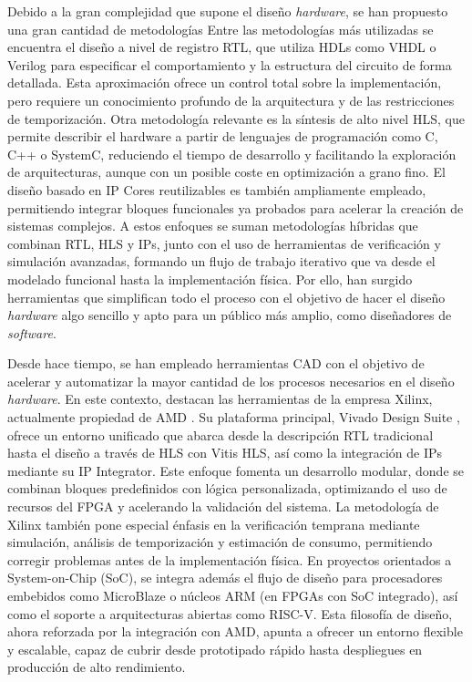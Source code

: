 Debido a la gran complejidad que supone el diseño \textit{hardware}, se han propuesto una gran cantidad de metodologías \cite{metodologiasHW} Entre las metodologías más utilizadas se encuentra el diseño a nivel de registro \ac{RTL}, que utiliza \ac{HDL}s como \ac{VHDL} o Verilog para especificar el comportamiento y la estructura del circuito de forma detallada. Esta aproximación ofrece un control total sobre la implementación, pero requiere un conocimiento profundo de la arquitectura y de las restricciones de temporización. Otra metodología relevante es la síntesis de alto nivel \ac{HLS}, que permite describir el hardware a partir de lenguajes de programación como C, C++ o SystemC, reduciendo el tiempo de desarrollo y facilitando la exploración de arquitecturas, aunque con un posible coste en optimización a grano fino. El diseño basado en \ac{IP} Cores reutilizables es también ampliamente empleado, permitiendo integrar bloques funcionales ya probados para acelerar la creación de sistemas complejos. A estos enfoques se suman metodologías híbridas que combinan RTL, HLS y IPs, junto con el uso de herramientas de verificación y simulación avanzadas, formando un flujo de trabajo iterativo que va desde el modelado funcional hasta la implementación física. Por ello, han surgido herramientas que simplifican todo el proceso con el objetivo de hacer el diseño \textit{hardware} algo sencillo y apto para un público más amplio, como diseñadores de \textit{software}. 

Desde hace tiempo, se han empleado herramientas \ac{CAD} con el objetivo de acelerar y automatizar la mayor cantidad de los procesos necesarios en el diseño \textit{hardware}. En este contexto, destacan las herramientas de la empresa Xilinx, actualmente propiedad de AMD \cite{compraXilinx}. Su plataforma principal, Vivado Design Suite \cite{vivadoInfo}, ofrece un entorno unificado que abarca desde la descripción RTL tradicional hasta el diseño a través de HLS con Vitis HLS, así como la integración de IPs mediante su IP Integrator. Este enfoque fomenta un desarrollo modular, donde se combinan bloques predefinidos con lógica personalizada, optimizando el uso de recursos del FPGA y acelerando la validación del sistema. La metodología de Xilinx también pone especial énfasis en la verificación temprana mediante simulación, análisis de temporización y estimación de consumo, permitiendo corregir problemas antes de la implementación física. En proyectos orientados a System-on-Chip (SoC), se integra además el flujo de diseño para procesadores embebidos como MicroBlaze o núcleos ARM (en FPGAs con SoC integrado), así como el soporte a arquitecturas abiertas como RISC-V. Esta filosofía de diseño, ahora reforzada por la integración con AMD, apunta a ofrecer un entorno flexible y escalable, capaz de cubrir desde prototipado rápido hasta despliegues en producción de alto rendimiento. 

